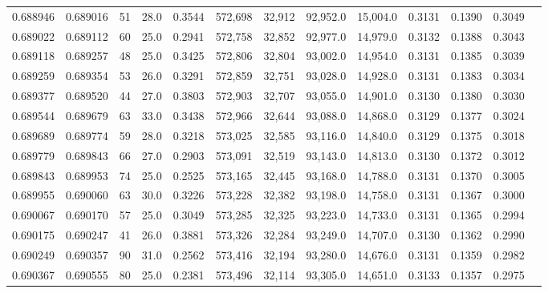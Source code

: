 \begin{tabular}{rrrrrrrrrrrrr}
0.688946 & 0.689016 &    51 & 28.0 &                                     0.3544 & 572,698 &  32,912 &  92,952.0 &  15,004.0 & 0.3131 & 0.1390 & 0.3049 \\
0.689022 & 0.689112 &    60 & 25.0 &                                     0.2941 & 572,758 &  32,852 &  92,977.0 &  14,979.0 & 0.3132 & 0.1388 & 0.3043 \\
0.689118 & 0.689257 &    48 & 25.0 &                                     0.3425 & 572,806 &  32,804 &  93,002.0 &  14,954.0 & 0.3131 & 0.1385 & 0.3039 \\
0.689259 & 0.689354 &    53 & 26.0 &                                     0.3291 & 572,859 &  32,751 &  93,028.0 &  14,928.0 & 0.3131 & 0.1383 & 0.3034 \\
0.689377 & 0.689520 &    44 & 27.0 &                                     0.3803 & 572,903 &  32,707 &  93,055.0 &  14,901.0 & 0.3130 & 0.1380 & 0.3030 \\
0.689544 & 0.689679 &    63 & 33.0 &                                     0.3438 & 572,966 &  32,644 &  93,088.0 &  14,868.0 & 0.3129 & 0.1377 & 0.3024 \\
0.689689 & 0.689774 &    59 & 28.0 &                                     0.3218 & 573,025 &  32,585 &  93,116.0 &  14,840.0 & 0.3129 & 0.1375 & 0.3018 \\
0.689779 & 0.689843 &    66 & 27.0 &                                     0.2903 & 573,091 &  32,519 &  93,143.0 &  14,813.0 & 0.3130 & 0.1372 & 0.3012 \\
0.689843 & 0.689953 &    74 & 25.0 &                                     0.2525 & 573,165 &  32,445 &  93,168.0 &  14,788.0 & 0.3131 & 0.1370 & 0.3005 \\
0.689955 & 0.690060 &    63 & 30.0 &                                     0.3226 & 573,228 &  32,382 &  93,198.0 &  14,758.0 & 0.3131 & 0.1367 & 0.3000 \\
0.690067 & 0.690170 &    57 & 25.0 &                                     0.3049 & 573,285 &  32,325 &  93,223.0 &  14,733.0 & 0.3131 & 0.1365 & 0.2994 \\
0.690175 & 0.690247 &    41 & 26.0 &                                     0.3881 & 573,326 &  32,284 &  93,249.0 &  14,707.0 & 0.3130 & 0.1362 & 0.2990 \\
0.690249 & 0.690357 &    90 & 31.0 &                                     0.2562 & 573,416 &  32,194 &  93,280.0 &  14,676.0 & 0.3131 & 0.1359 & 0.2982 \\
0.690367 & 0.690555 &    80 & 25.0 &                                     0.2381 & 573,496 &  32,114 &  93,305.0 &  14,651.0 & 0.3133 & 0.1357 & 0.2975 \\

\end{tabular}
